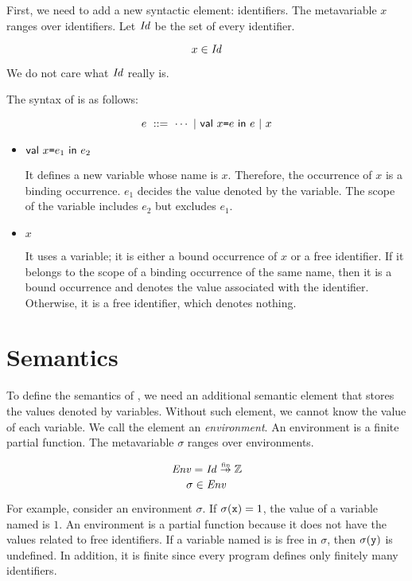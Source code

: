 First, we need to add a new syntactic element: identifiers. The metavariable
$x$ ranges over identifiers. Let $\mbox{\emph{Id}}$ be the set of every
identifier.

\[x\in\mbox{\emph{Id}}\]

We do not care what $\mbox{\emph{Id}}$ really is.

The syntax of \lang is as follows:

\[e\ ::=\ \cdots\ |\ \ebind{x}{e}{e}\ |\ x\]

\begin{itemize}
  \item $\textsf{val}\ x\texttt{=} e_1\ \textsf{in}\ e_2$

    It defines a new variable whose name is $x$. Therefore, the occurrence of $x$ is a
    binding occurrence. $e_1$ decides the value denoted by the variable. The
    scope of the variable includes $e_2$ but excludes $e_1$.

  \item $x$

    It uses a variable; it is either a bound occurrence of $x$ or a free identifier.
    If it belongs to the scope of a binding occurrence of the same name, then it is a
    bound occurrence and denotes the value associated with the identifier.
    Otherwise, it is a free identifier, which denotes nothing.
\end{itemize}

\section{Semantics}

To define the semantics of \lang, we need an additional semantic element that
stores the values denoted by variables. Without such element, we cannot know the
value of each variable. We call the element an
\textit{environment}. An environment is a finite partial
function. The metavariable $\sigma$ ranges over environments.

\[\embox{Env}=\embox{Id}\finto\mathbb{Z}\]
\[\sigma\in\mbox{\emph{Env}}\]

For example, consider an environment $\sigma$.
If $\sigma(\texttt{x})=1$, the value of a variable named  is $1$.
An environment is a partial function because it does not have the values
related to free identifiers. If a variable named  is is free in
$\sigma$, then $\sigma(\texttt{y})$ is undefined.
In addition, it is finite since every program
defines only finitely many identifiers.

